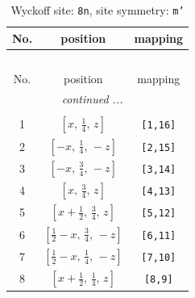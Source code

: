 \documentclass[fleqn,8pt]{jsarticle}
\begin{document}
\begin{longtable}{ccc}
\caption{Wyckoff site: {\tt 8n}, site symmetry: {\tt m'}}
 \\
 \hline \hline
No. & position & mapping \\ \hline \endfirsthead

\multicolumn{2}{l}{\tablename\ \thetable{}} \\
 \hline \hline
No. & position & mapping \\ \hline \endhead

 \hline \hline
\multicolumn{2}{r}{\footnotesize\it continued ...} \\ \endfoot

 \hline \hline
\multicolumn{2}{r}{} \\ \endlastfoot

1 & $\left[ x,\, \frac{1}{4},\, z \right]$ & {\tt [1,16]} \\ \hline
2 & $\left[ - x,\, \frac{1}{4},\, - z \right]$ & {\tt [2,15]} \\ \hline
3 & $\left[ - x,\, \frac{3}{4},\, - z \right]$ & {\tt [3,14]} \\ \hline
4 & $\left[ x,\, \frac{3}{4},\, z \right]$ & {\tt [4,13]} \\ \hline
5 & $\left[ x + \frac{1}{2},\, \frac{3}{4},\, z \right]$ & {\tt [5,12]} \\ \hline
6 & $\left[ \frac{1}{2} - x,\, \frac{3}{4},\, - z \right]$ & {\tt [6,11]} \\ \hline
7 & $\left[ \frac{1}{2} - x,\, \frac{1}{4},\, - z \right]$ & {\tt [7,10]} \\ \hline
8 & $\left[ x + \frac{1}{2},\, \frac{1}{4},\, z \right]$ & {\tt [8,9]} \\
\end{longtable}
\renewcommand{\arraystretch}{1.2}
\end{document}
